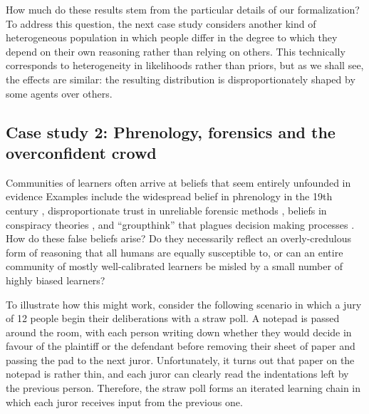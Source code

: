 \documentclass[doc]{apa6}
\begin{document}
How much do these results stem from the particular details of our formalization? To address this question, the next case study considers another kind of heterogeneous population in which people differ in the degree to which they depend on their own reasoning rather than relying on others. This technically corresponds to heterogeneity in likelihoods rather than priors, but as we shall see, the effects are similar: the resulting distribution is disproportionately shaped by some agents over others. 

\subsection{Case study 2: Phrenology, forensics and the overconfident crowd}

Communities of learners often arrive at beliefs that seem entirely unfounded in evidence Examples include the widespread belief in phrenology in the 19th century \parencite{faigman2007anecdotal}, disproportionate trust in unreliable forensic methods \parencite{pcast2016}, beliefs in conspiracy theories \parencite{goertzel1994belief}, and ``groupthink'' that plagues decision making processes \parencite{janis1982groupthink}. How do these false beliefs arise? Do they necessarily reflect an overly-credulous form of reasoning that all humans are equally susceptible to, or can an entire community of mostly well-calibrated learners be misled by a small number of highly biased learners? 

To illustrate how this might work, consider the following scenario in which a jury of 12 people begin their deliberations with a straw poll. A notepad is passed around the room, with each person writing down whether they would decide in favour of the plaintiff or the defendant before removing their sheet of paper and passing the pad to the next juror. Unfortunately, it turns out that paper on the notepad is rather thin, and each juror can clearly read the indentations left by the previous person. Therefore, the straw poll forms an iterated learning chain in which each juror receives input from the previous one. 
\end{document}
